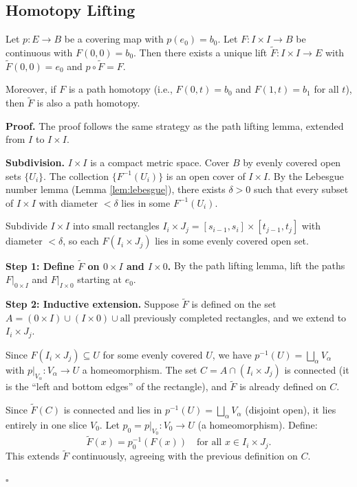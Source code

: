 \documentclass[11pt]{report}
\renewenvironment{proof}[1][Proof]{\noindent\textbf{#1.} }{\hfill$\square$\par\vspace{5pt}}
\begin{document}
\subsection{Homotopy Lifting}

\begin{lembox}
Let $p: E \to B$ be a covering map with $p(e_0) = b_0$. Let $F: I \times I \to B$ be continuous with $F(0, 0) = b_0$. Then there exists a unique lift $\tilde{F}: I \times I \to E$ with $\tilde{F}(0, 0) = e_0$ and $p \circ \tilde{F} = F$.

Moreover, if $F$ is a path homotopy (i.e., $F(0, t) = b_0$ and $F(1, t) = b_1$ for all $t$), then $\tilde{F}$ is also a path homotopy.
\end{lembox}

\begin{proof}
The proof follows the same strategy as the path lifting lemma, extended from $I$ to $I \times I$.

\textbf{Subdivision.} $I \times I$ is a compact metric space. Cover $B$ by evenly covered open sets $\{U_i\}$. The collection $\{F^{-1}(U_i)\}$ is an open cover of $I \times I$. By the Lebesgue number lemma (Lemma \ref{lem:lebesgue}), there exists $\delta > 0$ such that every subset of $I \times I$ with diameter $< \delta$ lies in some $F^{-1}(U_i)$.

Subdivide $I \times I$ into small rectangles $I_i \times J_j = [s_{i-1}, s_i] \times [t_{j-1}, t_j]$ with diameter $< \delta$, so each $F(I_i \times J_j)$ lies in some evenly covered open set.

\textbf{Step 1: Define $\tilde{F}$ on $0 \times I$ and $I \times 0$.} By the path lifting lemma, lift the paths $F|_{0 \times I}$ and $F|_{I \times 0}$ starting at $e_0$.

\textbf{Step 2: Inductive extension.} Suppose $\tilde{F}$ is defined on the set $A = (0 \times I) \cup (I \times 0) \cup \text{all previously completed rectangles}$, and we extend to $I_i \times J_j$.

Since $F(I_i \times J_j) \subseteq U$ for some evenly covered $U$, we have $p^{-1}(U) = \bigsqcup_\alpha V_\alpha$ with $p|_{V_\alpha}: V_\alpha \to U$ a homeomorphism. The set $C = A \cap (I_i \times J_j)$ is connected (it is the ``left and bottom edges'' of the rectangle), and $\tilde{F}$ is already defined on $C$.

Since $\tilde{F}(C)$ is connected and lies in $p^{-1}(U) = \bigsqcup_\alpha V_\alpha$ (disjoint open), it lies entirely in one slice $V_0$. Let $p_0 = p|_{V_0}: V_0 \to U$ (a homeomorphism). Define:
\[\tilde{F}(x) = p_0^{-1}(F(x)) \quad \text{for all } x \in I_i \times J_j.\]
This extends $\tilde{F}$ continuously, agreeing with the previous definition on $C$.


\end{proof}
\end{document}
